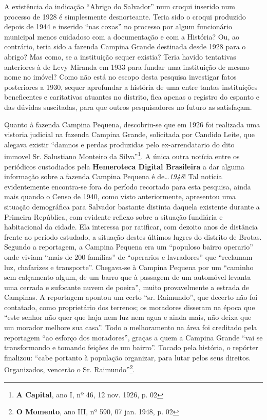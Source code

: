 A existência da indicação ``Abrigo do Salvador'' num croqui inserido num processo de 1928 é simplesmente desnorteante. Teria sido o croqui produzido depois de 1944 e inserido ``nas coxas'' no processo por algum funcionário municipal menos cuidadoso com a documentação e com a História? Ou, ao contrário, teria sido a fazenda Campina Grande destinada desde 1928 para o abrigo? Mas como, se a instituição sequer existia? Teria havido tentativas anteriores à de Levy Miranda em 1933 para fundar uma instituição de mesmo nome no imóvel? Como não está no escopo desta pesquisa investigar fatos posteriores a 1930, sequer aprofundar a história de uma entre tantas instituições beneficentes e caritativas atuantes no distrito, fica apenas o registro do espanto e das dúvidas suscitadas, para que outros pesquisadores no futuro as satisfaçam. 

Quanto à fazenda Campina Pequena, descobriu-se que em 1926 foi realizada uma vistoria judicial na fazenda Campina Grande, solicitada por Candido Leite, que alegava existir ``damnos e perdas produzidas pelo ex-arrendatario do dito immovel Sr. Salustiano Monteiro da Silva''\footnote{\textbf{A Capital}, ano I, nº 46, 12 nov. 1926, p. 02}. A única outra notícia entre os periódicos custodiados pela \textbf{Hemeroteca Digital Brasileira} a dar alguma informação sobre a fazenda Campina Pequena é de\dots \textit{1948}! Tal notícia evidentemente encontra-se fora do período recortado para esta pesquisa, ainda mais quando o Censo de 1940, como visto anteriormente, apresentou uma situação demográfica para Salvador bastante distinta daquela existente durante a Primeira República, com evidente reflexo sobre a situação fundiária e habitacional da cidade. Ela interessa por ratificar, com dezoito anos de distância frente ao período estudado, a situação destes últimos lugres do distrito de Brotas. Segundo a reportagem, a Campina Pequena era um ``populoso bairro operario'' onde viviam ``mais de 200 famílias'' de ``operarios e lavradores'' que ``reclamam luz, chafarizes e transporte''. Chegava-se à Campina Pequena por um ``caminho sem calçamento algum, de um barro que à passagem de um automóvel levanta uma cerrada e sufocante nuvem de poeira'', muito provavelmente a estrada de Campinas. A reportagem apontou um certo ``sr. Raimundo'', que decerto não foi contatado, como proprietário dos terrenos; os moradores disseram na época que ``este senhor não quer que haja nem luz nem agua e ainda mais, não deixa que um morador melhore sua casa''. Todo o melhoramento na área foi creditado pela reportagem ``ao esforço dos moradores'', graças a quem a Campina Grande ``vai se transformando e tomando feições de um bairro''. Tocado pela história, o repórter finalizou: ``cabe portanto à população organizar, para lutar pelos seus direitos. Organizados, vencerão o Sr. Raimundo''\footnote{\textbf{O Momento}, ano III, nº 590, 07 jan. 1948, p. 02}.

